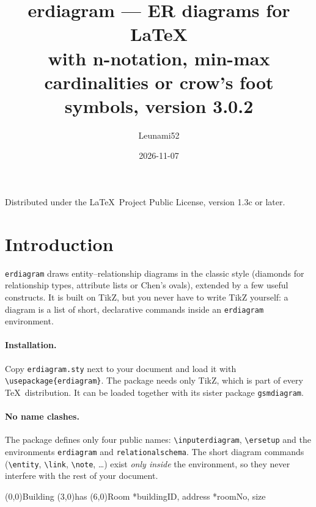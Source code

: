 \documentclass[10pt,a4paper]{article}
\title{\textbf{erdiagram} --- ER diagrams for \LaTeX\\[2pt]
  \large with n-notation, min-max cardinalities or crow's foot symbols, version 3.0.2}
\author{Leunami52}
\date{2026-11-07}
\newcommand\cs[1]{\texttt{\textbackslash#1}}
\begin{document}
\maketitle
\begin{center}\small Distributed under the \LaTeX\ Project Public License, version 1.3c or later.\end{center}
\tableofcontents

\section{Introduction}

\texttt{erdiagram} draws entity--relationship diagrams in the classic
style (diamonds for relationship types, attribute lists or Chen's ovals),
extended by a few useful constructs. It is built on TikZ, but you never have to write TikZ
yourself: a diagram is a list of short, declarative commands inside an
\texttt{erdiagram} environment.

\paragraph{Installation.} Copy \texttt{erdiagram.sty} next to your
document and load it with \verb|\usepackage{erdiagram}|. The package needs
only TikZ, which is part of every \TeX\ distribution. It can be loaded
together with its sister package \texttt{gsmdiagram}.

\paragraph{No name clashes.} The package defines only four public
names: \cs{inputerdiagram}, \cs{ersetup} and the environments \texttt{erdiagram}
and \texttt{relationalschema}. The short diagram commands (\cs{entity}, \cs{link},
\cs{note}, \dots) exist \emph{only inside} the environment, so they never
interfere with the rest of your document.

\begin{example}
\begin{erdiagram}
  (0,0){Building}
  (3,0){has}
  (6,0){Room}
    {*buildingID, address}
    {*roomNo, size}
\end{erdiagram}
\end{example}
\end{document}
